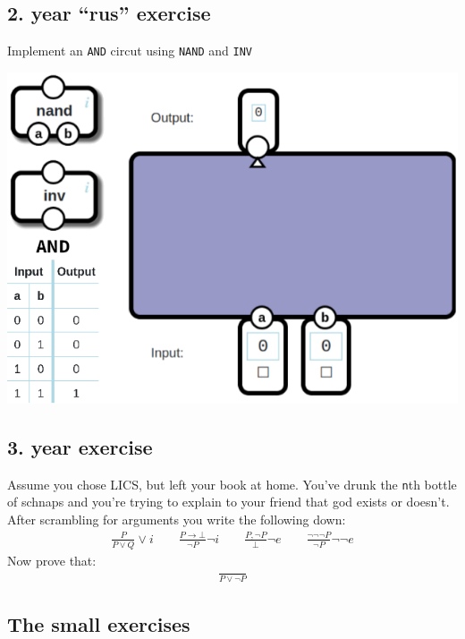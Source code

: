 \subsection{2. year ``rus'' exercise}
\vspace*{-.4cm}
Implement an \verb|AND| circut using \verb|NAND| and \verb|INV|
\vspace*{-.7cm}\\
\begin{center}
\includegraphics[width=1\textwidth]{figures/compsys.png}
\end{center}

\subsection{3. year exercise}
Assume you chose LICS, but left your book at home. You've drunk the \verb|n|th
bottle of schnaps and you're trying to explain to your friend that god exists
or doesn't. After scrambling for arguments you write the following down:
\begin{align*}
    \frac{P}{P\vee Q}\vee i
    \quad\quad\frac{P\rightarrow \bot}{\neg P}\neg i
    \quad\quad\frac{P,\neg P}{\bot}\neg e
    \quad\quad\frac{\neg\neg\neg P}{\neg P}\neg\neg e
\end{align*}
Now prove that:
\begin{align*}
   \frac{}{P \vee \neg P}
\end{align*}

\subsection{The small exercises}
\vspace{-0.1cm}

